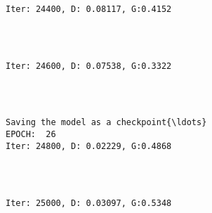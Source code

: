\documentclass[11pt]{article}
\begin{document}
    \begin{Verbatim}[commandchars=\\\{\}]

Iter: 24400, D: 0.08117, G:0.4152
    \end{Verbatim}

    \begin{center}
    \end{center}
    { \hspace*{\fill} \\}
    
    \begin{Verbatim}[commandchars=\\\{\}]

Iter: 24600, D: 0.07538, G:0.3322
    \end{Verbatim}

    \begin{center}
    \end{center}
    { \hspace*{\fill} \\}
    
    \begin{Verbatim}[commandchars=\\\{\}]

Saving the model as a checkpoint{\ldots}
EPOCH:  26
Iter: 24800, D: 0.02229, G:0.4868
    \end{Verbatim}

    \begin{center}
    \end{center}
    { \hspace*{\fill} \\}
    
    \begin{Verbatim}[commandchars=\\\{\}]

Iter: 25000, D: 0.03097, G:0.5348
    \end{Verbatim}

    \begin{center}
    \end{center}
    { \hspace*{\fill} \\}
    
\end{document}

